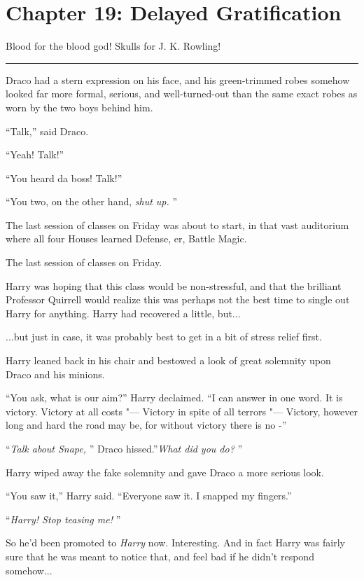 \chapter{Chapter 19: Delayed Gratification}
Blood for the blood god! Skulls for J. K. Rowling!

\begin{center}\rule{3in}{0.4pt}\end{center}

Draco had a stern expression on his face, and his green-trimmed robes
somehow looked far more formal, serious, and well-turned-out than the
same exact robes as worn by the two boys behind him.

``Talk,'' said Draco.

``Yeah! Talk!''

``You heard da boss! Talk!''

``You two, on the other hand, \emph{shut up.} ''

The last session of classes on Friday was about to start, in that vast
auditorium where all four Houses learned Defense, er, Battle Magic.

The last session of classes on Friday.

Harry was hoping that this class would be non-stressful, and that the
brilliant Professor Quirrell would realize this was perhaps not the best
time to single out Harry for anything. Harry had recovered a little,
but...

...but just in case, it was probably best to get in a bit of stress
relief first.

Harry leaned back in his chair and bestowed a look of great solemnity
upon Draco and his minions.

``You ask, what is our aim?'' Harry declaimed. ``I can answer in one
word. It is victory. Victory at all costs "--- Victory in spite of all
terrors "--- Victory, however long and hard the road may be, for without
victory there is no -''

``\emph{Talk about Snape,} '' Draco hissed.''\emph{What did you do?} ''

Harry wiped away the fake solemnity and gave Draco a more serious look.

``You saw it,'' Harry said. ``Everyone saw it. I snapped my fingers.''

``\emph{Harry! Stop teasing me!} ''

So he'd been promoted to \emph{Harry} now. Interesting. And in fact
Harry was fairly sure that he was meant to notice that, and feel bad if
he didn't respond somehow...

